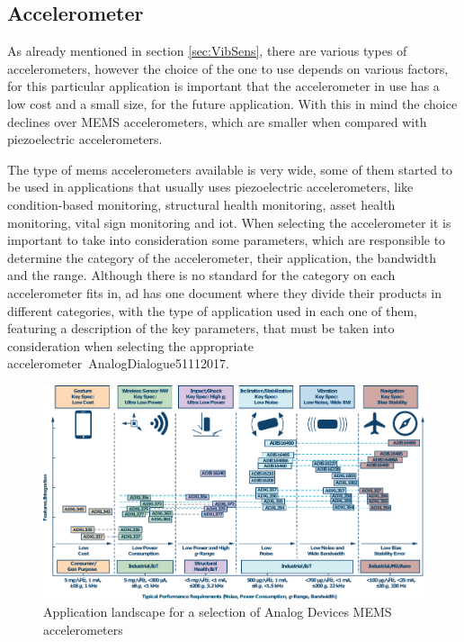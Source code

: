 \subsection{Accelerometer}
As already mentioned in section \ref{sec:VibSens}, there are various types of accelerometers, however the choice of the one to use depends on various factors, for this particular application is important that the accelerometer in use has a low cost and a small size, for the future application. With this in mind the choice declines over MEMS accelerometers, which are smaller when compared with piezoelectric accelerometers.

The type of \acrshort{mems} accelerometers available is very wide, some of them started to be used in applications that usually uses piezoelectric accelerometers, like condition-based monitoring, structural health monitoring, asset health monitoring, vital sign monitoring and \acrshort{iot}. When selecting the accelerometer it is important to take into consideration some parameters, which are responsible to determine the category of the accelerometer, their application, the bandwidth and the range. Although there is no standard for the category on each accelerometer fits in, \acrlong{ad} has one document where they divide their products in different categories, with the type of application used in each one of them, featuring a description of the key parameters, that must be taken into consideration when selecting the appropriate accelerometer~\cite{AnalogDialogue51102017}{AnalogDialogue51112017}.
\begin{figure}[]
    \centering
    \includegraphics[width=1\textwidth]{Chapters/4CHP/Figures/adTable.pdf}
    \caption{Application landscape for a selection of Analog Devices MEMS accelerometers}
    \label{fig:adtable}
\end{figure}

